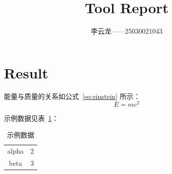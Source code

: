 \documentclass{article}
\begin{document}
\title{Tool Report}
\author{李云龙——25030021043}
\maketitle
\section{Result}

能量与质量的关系如公式~\eqref{eq:einstein} 所示：
\begin{equation}
    E = mc^2
    \label{eq:einstein}
\end{equation}

示例数据见表~\ref{tab:sample}：
\begin{table}[h]
    \centering
    \caption{示例数据}
    \label{tab:sample}
    \begin{tabular}{cc}
        \hline
        alpha & 2 \\
        beta  & 3 \\
        \hline
    \end{tabular}
\end{table}
\end{document}

